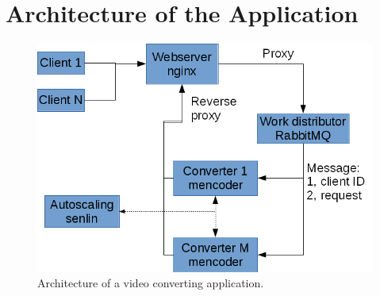 \documentclass[]{article}
\begin{document}
\section*{Architecture of the Application}

\begin{figure}[!t]
  \centering
  \includegraphics[width=\linewidth]{arch_diagram}
  \caption{Architecture of a video converting application.}
  \label{fig:arch_diagram}
\end{figure}
\end{document}
